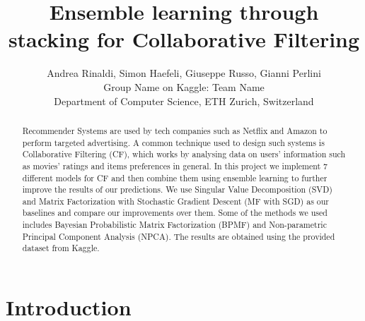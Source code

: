 \documentclass[10pt,conference,compsocconf]{IEEEtran}
\begin{document}
\title{Ensemble learning through stacking for Collaborative Filtering}

\author{
  Andrea Rinaldi, Simon Haefeli, Giuseppe Russo, Gianni Perlini\\
  Group Name on Kaggle: Team Name \\
  Department of Computer Science, ETH Zurich, Switzerland
}

\maketitle

\begin{abstract}

Recommender Systems are used by tech companies such as Netflix and Amazon to perform targeted advertising. A common technique used to design such systems is Collaborative Filtering (CF), which works by analysing data on users' information such as movies' ratings and items preferences in general. In this project we implement 7 different models for CF and then combine them using ensemble learning to further improve the results of our predictions. We use Singular Value Decomposition (SVD) and Matrix Factorization with Stochastic Gradient Descent (MF with SGD) as our baselines and compare our improvements over them. Some of the methods we used includes Bayesian Probabilistic Matrix Factorization (BPMF) and Non-parametric Principal Component Analysis (NPCA). The results are obtained using the provided dataset from Kaggle.

\end{abstract}

\section{Introduction}
\label{int}
\end{document}
